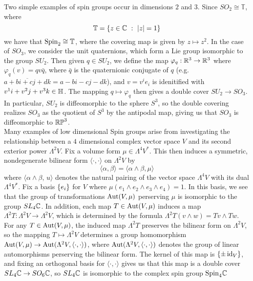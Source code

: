 Two simple examples of spin groups occur in dimensions $2$ and $3$.
Since $SO_2 \cong \mathbb{T}$, where
\[
\mathbb{T} = \left\lbrace z \in \mathbb{C} ~:~ |z| = 1 \right\rbrace
\]
we have that $\mathrm{Spin}_2 \cong \mathbb{T}$, where the covering map is given
by $z \mapsto z^2$. In the case of $SO_3$, we consider the unit quaternions,
which form a Lie group isomorphic to the group $SU_2$. Then given $q \in SU_2$, we define
the map $\varphi_q : \mathbb{R}^3 \to \mathbb{R}^3$ where $\varphi_q(v) = qv\bar{q}$, where
$\bar{q}$ is the quaternionic conjugate of $q$ (e.g. $\overline{a + bi + cj +dk}
= a -bi -cj -dk$), and $v = v^ie_i$ is idenitified with $v^1 i + v^2j + v^3k \in \mathbb{H}$.
The mapping $q \mapsto \varphi_q$ then gives a double cover $SU_2 \to SO_3$.
In particular, $SU_2$ is diffeomorphic to the sphere $S^3$, so the double
covering realizes $SO_3$ as the quotient of $S^3$ by the antipodal map,
giving us that $SO_3$ is diffeomorphic to $\mathbb{RP}^3$. \\

Many examples of low dimensional Spin groups arise from investigating the
relationship between a $4$ dimensional complex vector space $V$ and its second
exterior power $\Lambda^2V$. Fix a volume form $\mu \in \Lambda^4V^*$. This then
induces a symmetric, nondegenerate bilinear form $\langle \cdot,\cdot \rangle$
on $\Lambda^2V$ by
\[
\langle \alpha,\beta \rangle = \langle \alpha \wedge \beta, \mu \rangle
\]
where $\langle \alpha \wedge \beta, \,u \rangle$ denotes the natural pairing of
the vector space $\Lambda^4V$ with its dual $\Lambda^4V^*$. Fix a basis
$\left\lbrace e_i \right\rbrace$ for $V$ where $\mu(e_1 \wedge e_2 \wedge e_3 \wedge e_4) = 1$. In this basis,
we see that the group of transformations $\operatorname{Aut}(V, \mu)$ perserving $\mu$ is
isomorphic to the group $SL_4\mathbb{C}$. In addition, each map $T \in \operatorname{Aut}(V, \mu)$
induces a map $\Lambda^2 T : \Lambda^2V \to \Lambda^2V$, which is determined
by the formula $\Lambda^2 T(v \wedge w) = Tv \wedge Tw$. For any $T \in \operatorname{Aut}(V, \mu)$,
the induced map $\Lambda^2 T$ preserves the bilinear form on $\Lambda^2V$, so the
mapping $T \mapsto \Lambda^2V$ determines a group homomorphism
$\operatorname{Aut}(V, \mu) \to \operatorname{Aut}(\Lambda^2V, \langle \cdot,\cdot \rangle)$, where
$\operatorname{Aut}(\Lambda^2V,\langle\cdot,\cdot\rangle)$ denotes the group of linear automorphisms
perserving the bilinear form. The kernel of this map is $\left\lbrace \pm \operatorname{id}_V \right\rbrace$, and fixing
an orthogonal basis for $\langle\cdot,\cdot\rangle$ gives us that this map is
a double cover $SL_4\mathbb{C} \to SO_6\mathbb{C}$, so $SL_4\mathbb{C}$ is isomorphic to the
complex spin group $\mathrm{Spin}_4\mathbb{C}$ \\

